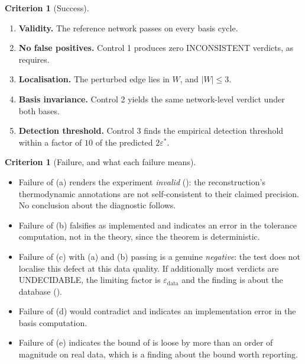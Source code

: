 \documentclass[11pt,twocolumn,a4paper]{article}
\theoremstyle{pstyle}
\theoremstyle{definition}
\newtheorem{criterion}[theorem]{Criterion}
\theoremstyle{remark}
\newcommand{\abs}[1]{\lvert#1\rvert}
\newcommand{\eps}{\varepsilon}
\newcommand{\epsdata}{\eps_{\mathrm{data}}}
\newcommand{\epsstar}{\eps^{\ast}}
\begin{document}
\begin{criterion}[Success]
\label{crit:success}
\leavevmode
\begin{enumerate}[label=(\alph*),leftmargin=2em,itemsep=2pt]
\item \textbf{Validity.} The reference network passes
 on every basis cycle.
\item \textbf{No false positives.} Control 1 produces zero
\textsf{INCONSISTENT} verdicts, as 
requires.
\item \textbf{Localisation.} The perturbed edge lies in $W$, and
$\abs{W}\le 3$.
\item \textbf{Basis invariance.} Control 2 yields the same network-level
verdict under both bases.
\item \textbf{Detection threshold.} Control 3 finds the empirical
detection threshold within a factor of $10$ of the predicted
$2\epsstar$.
\end{enumerate}
\end{criterion}

\begin{criterion}[Failure, and what each failure means]
\label{crit:failure}
\leavevmode
\begin{itemize}[leftmargin=1.5em,itemsep=2pt]
\item Failure of (a) renders the experiment \emph{invalid}
(): the reconstruction's thermodynamic annotations
are not self-consistent to their claimed precision. No conclusion about
the diagnostic follows.
\item Failure of (b) falsifies  as
implemented and indicates an error in the tolerance computation, not in
the theory, since the theorem is deterministic.
\item Failure of (c) with (a) and (b) passing is a genuine
\emph{negative}: the test does not localise this defect at this data
quality. If additionally most verdicts are \textsf{UNDECIDABLE}, the
limiting factor is $\epsdata$ and the finding is about the database
().
\item Failure of (d) would contradict  and
indicates an implementation error in the basis computation.
\item Failure of (e) indicates the bound of  is
loose by more than an order of magnitude on real data, which is a
finding about the bound worth reporting.
\end{itemize}
\end{criterion}
\end{document}
